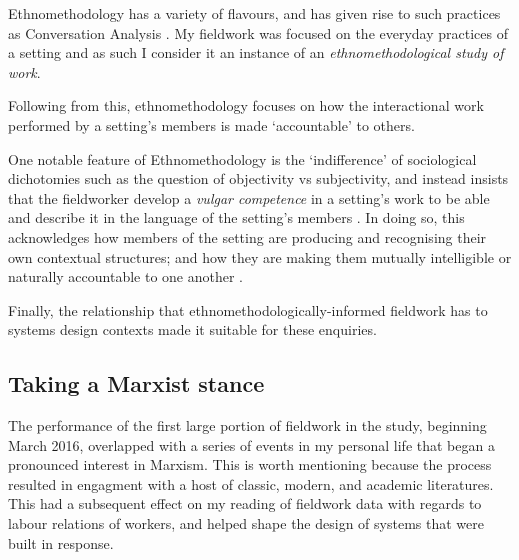 
Ethnomethodology has a variety of flavours, and has given rise to such practices as Conversation Analysis . My fieldwork was focused on the everyday practices of a setting and as such I consider it an instance of an \textit{ethnomethodological study of work}.

Following from this, ethnomethodology focuses on how the interactional work performed by a setting's members is made `accountable' to others.


One notable feature of Ethnomethodology is the `indifference' of sociological dichotomies such as the question of objectivity vs subjectivity, and instead insists that the fieldworker develop a \textit{vulgar competence} in a setting's work to be able and describe it in the language of the setting's members \cite{randall_fieldwork_2007, crabtree_doing_2012}. In doing so, this acknowledges how members of the setting are producing and recognising their own contextual structures; and how they are making them mutually intelligible or naturally accountable to one another \cite{garfinkel_studies_1967, randall_fieldwork_2007}.


Finally, the relationship that ethnomethodologically-informed fieldwork has to systems design contexts made it suitable for these enquiries.


\subsection{Taking a Marxist stance}

The performance of the first large portion of fieldwork in the study, beginning March 2016, overlapped with a series of events in my personal life that began a pronounced interest in Marxism. This is worth mentioning because the process resulted in engagment with a host of classic, modern, and academic literatures. This had a subsequent effect on my reading of fieldwork data with regards to labour relations of workers, and helped shape the design of systems that were built in response.


